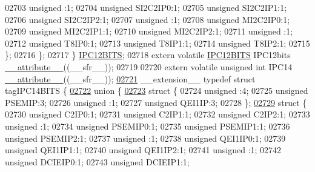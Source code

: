 \begin{DoxyCode}
02703       \textcolor{keywordtype}{unsigned} :1;
02704       \textcolor{keywordtype}{unsigned} SI2C2IP0:1;
02705       \textcolor{keywordtype}{unsigned} SI2C2IP1:1;
02706       \textcolor{keywordtype}{unsigned} SI2C2IP2:1;
02707       \textcolor{keywordtype}{unsigned} :1;
02708       \textcolor{keywordtype}{unsigned} MI2C2IP0:1;
02709       \textcolor{keywordtype}{unsigned} MI2C2IP1:1;
02710       \textcolor{keywordtype}{unsigned} MI2C2IP2:1;
02711       \textcolor{keywordtype}{unsigned} :1;
02712       \textcolor{keywordtype}{unsigned} T8IP0:1;
02713       \textcolor{keywordtype}{unsigned} T8IP1:1;
02714       \textcolor{keywordtype}{unsigned} T8IP2:1;
02715     \};
02716   \};
02717 \} \hyperlink{a00008_d4/d40/a00516}{IPC12BITS};
02718 \textcolor{keyword}{extern} \textcolor{keyword}{volatile} \hyperlink{a00008_d4/d40/a00516}{IPC12BITS} IPC12bits \hyperlink{a00009_a493c46f03454991ccc5aa7a6e1dfb2a7}{\_\_attribute\_\_}((\_\_sfr\_\_));
02719 
02720 \textcolor{keyword}{extern} \textcolor{keyword}{volatile} \textcolor{keywordtype}{unsigned} \textcolor{keywordtype}{int}  IPC14 \hyperlink{a00009_a493c46f03454991ccc5aa7a6e1dfb2a7}{\_\_attribute\_\_}((\_\_sfr\_\_));
\hypertarget{a00009_source_l02721}{}\hyperlink{a00008}{02721} \_\_extension\_\_ \textcolor{keyword}{typedef} \textcolor{keyword}{struct }tagIPC14BITS \{
\hypertarget{a00009_source_l02722}{}\hyperlink{a00009}{02722}   \textcolor{keyword}{union }\{
\hypertarget{a00009_source_l02723}{}\hyperlink{a00009}{02723}     \textcolor{keyword}{struct }\{
02724       \textcolor{keywordtype}{unsigned} :4;
02725       \textcolor{keywordtype}{unsigned} PSEMIP:3;
02726       \textcolor{keywordtype}{unsigned} :1;
02727       \textcolor{keywordtype}{unsigned} QEI1IP:3;
02728     \};
\hypertarget{a00009_source_l02729}{}\hyperlink{a00009}{02729}     \textcolor{keyword}{struct }\{
02730       \textcolor{keywordtype}{unsigned} C2IP0:1;
02731       \textcolor{keywordtype}{unsigned} C2IP1:1;
02732       \textcolor{keywordtype}{unsigned} C2IP2:1;
02733       \textcolor{keywordtype}{unsigned} :1;
02734       \textcolor{keywordtype}{unsigned} PSEMIP0:1;
02735       \textcolor{keywordtype}{unsigned} PSEMIP1:1;
02736       \textcolor{keywordtype}{unsigned} PSEMIP2:1;
02737       \textcolor{keywordtype}{unsigned} :1;
02738       \textcolor{keywordtype}{unsigned} QEI1IP0:1;
02739       \textcolor{keywordtype}{unsigned} QEI1IP1:1;
02740       \textcolor{keywordtype}{unsigned} QEI1IP2:1;
02741       \textcolor{keywordtype}{unsigned} :1;
02742       \textcolor{keywordtype}{unsigned} DCIEIP0:1;
02743       \textcolor{keywordtype}{unsigned} DCIEIP1:1;

\end{DoxyCode}
